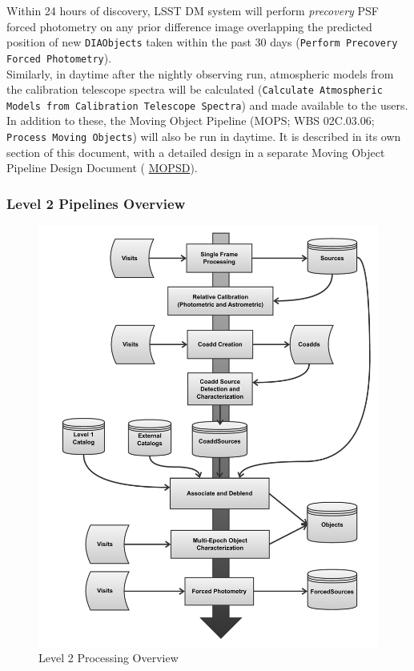 \documentclass[12pt]{article}
\newcommand{\code}[1]{\texttt{#1}}
\newcommand{\DIAObjects}{\code{DIAObjects}\xspace}
\newcommand{\ds}[2]{{\color{blue} \href{https://docushare.lsstcorp.org/docushare/dsweb/Get/#1}{#2}}\xspace}
\newcommand{\MOPSD}{\ds{LDM-156}{MOPSD}}
\newcommand{\wbsMOPS}{WBS 02C.03.06}
\newcommand{\uc}[1]{{\tt #1}}
\begin{document}
Within 24 hours of discovery, LSST DM system will perform {\em precovery} PSF forced photometry on any prior difference image overlapping the predicted position of new \DIAObjects taken within the past 30 days (\uc{Perform Precovery Forced Photometry}).
\\

Similarly, in daytime after the nightly observing run, atmospheric models from the calibration telescope spectra will be calculated (\uc{Calculate Atmospheric Models from Calibration Telescope Spectra}) and made available to the users.
\\

In addition to these, the Moving Object Pipeline (MOPS; \wbsMOPS; \uc{Process Moving Objects}) will also be run in daytime. It is described in its own section of this document, with a detailed design in a separate Moving Object Pipeline Design Document (\MOPSD).

\subsubsection{Level 2 Pipelines Overview}

\begin{figure}[!htbp]
    \centering
    \includegraphics[scale=0.5]{Level_2_Processing_Flowchart}
    \caption{Level 2 Processing Overview\label{fig:level2dp}}    
\end{figure}
\end{document}
